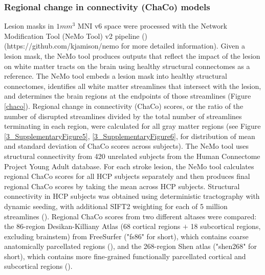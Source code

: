 \documentclass[phd,tocprelim]{cornell}
\def\Plus{\texttt{+}}
\begin{document}
\subsubsection{Regional change in connectivity (ChaCo) models}
Lesion masks in $1mm^3$ MNI v6 space were processed with the Network Modification Tool (NeMo Tool) v2 pipeline (\cite{Kuceyeski2013-nk}) (https://github.com/kjamison/nemo for more detailed information). Given a lesion mask, the NeMo tool produces outputs that reflect the impact of the lesion on white matter tracts on the brain using healthy structural connectomes as a reference. The NeMo tool embeds a lesion mask into healthy structural connectomes, identifies all white matter streamlines that intersect with the lesion, and determines the brain regions at the endpoints of those streamlines (Figure \ref{chaco}). Regional change in connectivity (ChaCo) scores, or the ratio of the number of disrupted streamlines divided by the total number of streamlines terminating in each region, were calculated for all gray matter regions (see Figure \ref{3_SupplementaryFigure5}, \ref{3_SupplementaryFigure6}, for distribution of mean and standard deviation of ChaCo scores across subjects). The NeMo tool uses structural connectivity from 420 unrelated subjects from the Human Connectome Project Young Adult database. For each stroke lesion, the NeMo tool calculates regional ChaCo scores for all HCP subjects separately and then produces final regional ChaCo scores by taking the mean across HCP subjects. Structural connectivity in HCP subjects was obtained using deterministic tractography with dynamic seeding, with additional SIFT2 weighting for each of 5 million streamlines (\cite{Smith2015-eb}). Regional ChaCo scores from two different altases were compared: the 86-region Desikan-Killiany Atlas (68 cortical regions $\Plus$ 18 subcortical regions, excluding brainstem) from FreeSurfer ("fs86" for short), which contains coarse anatomically parcellated regions (\cite{Desikan2006-vf,Fischl2002-lb}), and the 268-region Shen atlas ("shen268" for short), which contains more fine-grained functionally parcellated cortical and subcortical regions (\cite{Shen2013-zn}).
\end{document}

